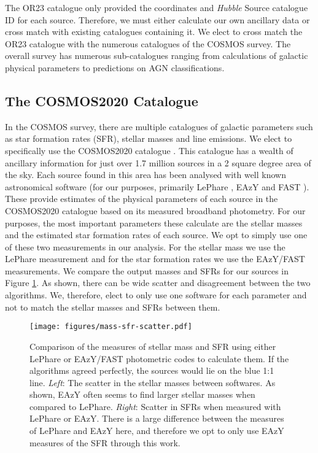 \documentclass[fleqn,usenatbib]{mnras}
\begin{document}
The OR23 catalogue only provided the coordinates and \textit{Hubble} Source catalogue ID for each source. Therefore, we must either calculate our own ancillary data or cross match with existing catalogues containing it. We elect to cross match the OR23 catalogue with the numerous catalogues of the COSMOS survey. The overall survey has numerous sub-catalogues ranging from calculations of galactic physical parameters to predictions on AGN classifications. 

\subsection{The COSMOS2020 Catalogue}
In the COSMOS survey, there are multiple catalogues of galactic parameters such as star formation rates (SFR), stellar masses and line emissions. We elect to specifically use the COSMOS2020 catalogue \citep{2022ApJS..258...11W}. This catalogue has a wealth of ancillary information for just over 1.7 million sources in a 2 square degree area of the sky. Each source found in this area has been analysed with well known astronomical software (for our purposes, primarily  LePhare \citep{1999MNRAS.310..540A, 2006A&A...457..841I}, EAzY \citep{2008ApJ...686.1503B} and FAST \citep{2017MNRAS.465.3390A}). These provide estimates of the physical parameters of each source in the COSMOS2020 catalogue based on its measured broadband photometry. For our purposes, the most important parameters these calculate are the stellar masses and the estimated star formation rates of each source. We opt to simply use one of these two measurements in our analysis. For the stellar mass we use the LePhare measurement and for the star formation rates we use the EAzY/FAST measurements. We compare the output masses and SFRs for our sources in Figure \ref{fig:difference-measures}. As shown, there can be wide scatter and disagreement between the two algorithms. We, therefore, elect to only use one software for each parameter and not to match the stellar masses and SFRs between them.

\begin{figure}
    \centering
    \texttt{[image: figures/mass-sfr-scatter.pdf]}
    \caption{Comparison of the measures of stellar mass and SFR using either LePhare or EAzY/FAST photometric codes to calculate them. If the algorithms agreed perfectly, the sources would lie on the blue 1:1 line. \textit{Left}: The scatter in the stellar masses between softwares. As shown, EAzY often seems to find larger stellar masses when compared to LePhare. \textit{Right}: Scatter in SFRs when measured with LePhare or EAzY. There is a large difference between the measures of LePhare and EAzY here, and therefore we opt to only use EAzY measures of the SFR through this work.}
    \label{fig:difference-measures}
\end{figure}
\end{document}
